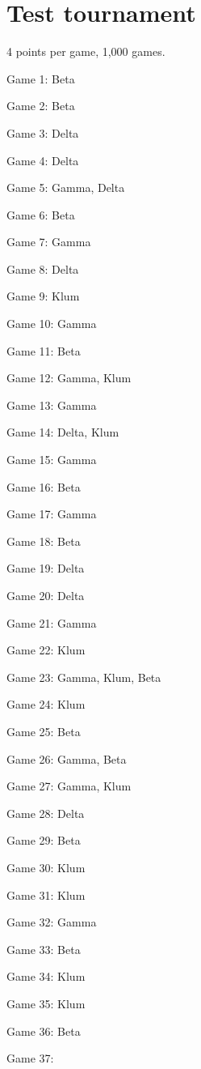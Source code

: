 \documentclass{article}
\begin{document}
\section{Test tournament}
4 points per game, 1,000 games.
\begin{multicols}{3}\raggedcolumns
\begin{compactitem}
\item Game 1:
Beta
\item Game 2:
Beta
\item Game 3:
Delta
\item Game 4:
Delta
\item Game 5:
Gamma, Delta
\item Game 6:
Beta
\item Game 7:
Gamma
\item Game 8:
Delta
\item Game 9:
Klum
\item Game 10:
Gamma
\item Game 11:
Beta
\item Game 12:
Gamma, Klum
\item Game 13:
Gamma
\item Game 14:
Delta, Klum
\item Game 15:
Gamma
\item Game 16:
Beta
\item Game 17:
Gamma
\item Game 18:
Beta
\item Game 19:
Delta
\item Game 20:
Delta
\item Game 21:
Gamma
\item Game 22:
Klum
\item Game 23:
Gamma, Klum, Beta
\item Game 24:
Klum
\item Game 25:
Beta
\item Game 26:
Gamma, Beta
\item Game 27:
Gamma, Klum
\item Game 28:
Delta
\item Game 29:
Beta
\item Game 30:
Klum
\item Game 31:
Klum
\item Game 32:
Gamma
\item Game 33:
Beta
\item Game 34:
Klum
\item Game 35:
Klum
\item Game 36:
Beta
\item Game 37:

\end{compactitem}
\end{multicols}
\end{document}
